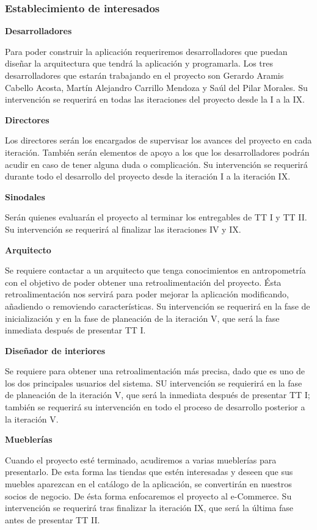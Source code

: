 \subsubsection{Establecimiento de interesados}
\textbf{Desarrolladores} \par
Para poder construir la aplicación requeriremos desarrolladores que puedan diseñar la arquitectura que tendrá la aplicación y programarla. Los tres desarrolladores que estarán trabajando en el proyecto son Gerardo Aramis Cabello Acosta, Martín Alejandro Carrillo Mendoza y Saúl del Pilar Morales. Su intervención se requerirá en todas las iteraciones del proyecto desde la I a la IX.\par
\textbf{Directores} \par
Los directores serán los encargados de supervisar los avances del proyecto en cada iteración. También serán elementos de apoyo a los que los desarrolladores podrán acudir en caso de tener alguna duda o complicación. Su intervención se requerirá durante todo el desarrollo del proyecto desde la iteración I a la iteración IX.\par
\textbf{Sinodales} \par
Serán quienes evaluarán el proyecto al terminar los entregables de TT I y TT II. Su intervención se requerirá al finalizar las iteraciones IV y IX.\par
\textbf{Arquitecto} \par
Se requiere contactar a un arquitecto que tenga conocimientos en antropometría con el objetivo de poder obtener una retroalimentación del proyecto. Ésta retroalimentación nos servirá para poder mejorar la aplicación modificando, añadiendo o removiendo características. Su intervención se requerirá en la fase de inicialización y en la fase de planeación de la iteración V, que será la fase inmediata después de presentar TT I.\par
\textbf{Diseñador de interiores} \par
Se requiere para obtener una retroalimentación más precisa, dado que es uno de los dos principales usuarios del sistema. SU intervención se requierirá en la fase de planeación de la iteración V, que será la inmediata después de presentar TT I; también se requerirá su intervención en todo el proceso de desarrollo posterior a la iteración V.\par
\textbf{Mueblerías} \par
Cuando el proyecto esté terminado, acudiremos a varias mueblerías para presentarlo. De esta forma las tiendas que estén interesadas y deseen que sus muebles aparezcan en el catálogo de la aplicación, se convertirán en nuestros socios de negocio. De ésta forma enfocaremos el proyecto al e-Commerce. Su intervención se requerirá tras finalizar la iteración IX, que será la última fase antes de presentar TT II.\par

